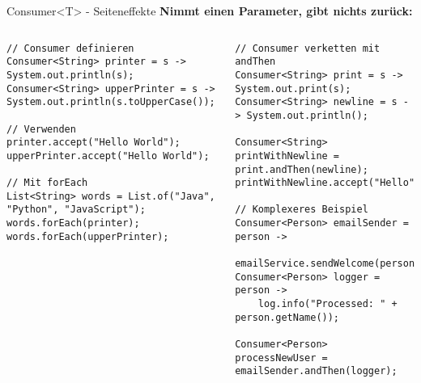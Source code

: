 \begin{frame}[fragile]{Consumer<T> - Seiteneffekte}
  \textbf{Nimmt einen Parameter, gibt nichts zurück:}

  \begin{columns}[T]
    \begin{lstlisting}[style=java, basicstyle=\tiny\ttfamily]
// Consumer definieren
Consumer<String> printer = s -> System.out.println(s);
Consumer<String> upperPrinter = s -> System.out.println(s.toUpperCase());

// Verwenden
printer.accept("Hello World");
upperPrinter.accept("Hello World");

// Mit forEach
List<String> words = List.of("Java", "Python", "JavaScript");
words.forEach(printer);
words.forEach(upperPrinter);
    \end{lstlisting}

    \begin{lstlisting}[style=java, basicstyle=\tiny\ttfamily]
// Consumer verketten mit andThen
Consumer<String> print = s -> System.out.print(s);
Consumer<String> newline = s -> System.out.println();

Consumer<String> printWithNewline = print.andThen(newline);
printWithNewline.accept("Hello");

// Komplexeres Beispiel
Consumer<Person> emailSender = person ->
    emailService.sendWelcome(person.getEmail());
Consumer<Person> logger = person ->
    log.info("Processed: " + person.getName());

Consumer<Person> processNewUser = emailSender.andThen(logger);
    \end{lstlisting}
  \end{columns}
\end{frame}

